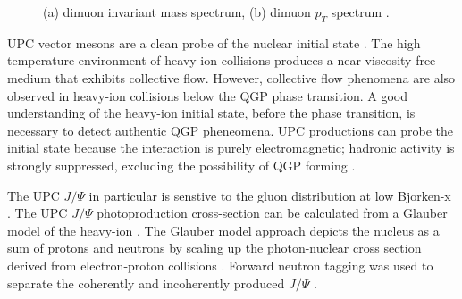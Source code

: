 \begin{figure}%
    \centering
    \qquad
    \caption{(a) dimuon invariant mass spectrum, (b) dimuon $p_T$ spectrum \cite{Khachatryan:2016qhq}.}%
    \label{fig:patKennyPlots}%
\end{figure}

UPC vector mesons are a clean probe of the nuclear initial state \cite{Aktas:2006qs}\cite{oniaPol}. The high temperature environment of heavy-ion collisions produces a near viscosity free medium that exhibits collective flow. However, collective flow phenomena are also observed in heavy-ion collisions below the QGP phase transition. A good understanding of the heavy-ion initial state, before the phase transition, is necessary to detect authentic QGP pheneomena. UPC productions can probe the initial state because the interaction is purely electromagnetic; hadronic activity is strongly suppressed, excluding the possibility of QGP forming \cite{vmd1999}\cite{vmd2000.03}. 

The UPC $J/\Psi$ in particular is senstive to the gluon distribution at low Bjorken-x \cite{Teubner:2005sj}. The UPC $J/\Psi$ photoproduction cross-section can be calculated from a Glauber model of the heavy-ion \cite{Brodsky:1994kf}. The Glauber model approach depicts the nucleus as a sum of protons and neutrons by scaling up the photon-nuclear cross section derived from electron-proton collisions \cite{Miller:2007ri}. Forward neutron tagging was used to separate the coherently and incoherently produced $J/\Psi$ \cite{Guzey:2013jaa} \cite{Strikman:2005ze} \cite{lta2012.03}\cite{emPcite4}\cite{emPCite5}\cite{emPCite6}\cite{upcNeuPHENIX}.

